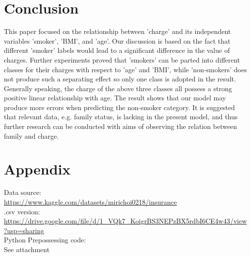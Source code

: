 \documentclass[12pt,a4paper]{article}
\begin{document}
\section{Conclusion}
This paper focused on the relationship between 'charge' and its independent variables 'smoker', 'BMI', and 'age'. Our discussion is based on the fact that different 'smoker' labels would lead to a significant difference in the value of charges. Further experiments proved that 'smokers' can be parted into different classes for their charges with respect to 'age' and 'BMI', while 'non-smokers' does not produce such a separating effect so only one class is adopted in the result. Generally speaking, the charge of the above three classes all possess a strong positive linear relationship with age. 
The result shows that our model may produce more errors when predicting the non-smoker category. It is suggested that relevant data, e.g. family status, is lacking in the present model, and thus further research can be conducted with aims of observing the relation between family and charge.


\section{Appendix}
\noindent
Data source: \\
\url{https://www.kaggle.com/datasets/mirichoi0218/insurance}\\
.csv version: \\
 \url{https://drive.google.com/file/d/1_VQk7_KoigrBS3NEPzBX5rdbI6CE4w43/view?usp=sharing}\\
Python Prepossessing code: \\
See attachment
\end{document}
